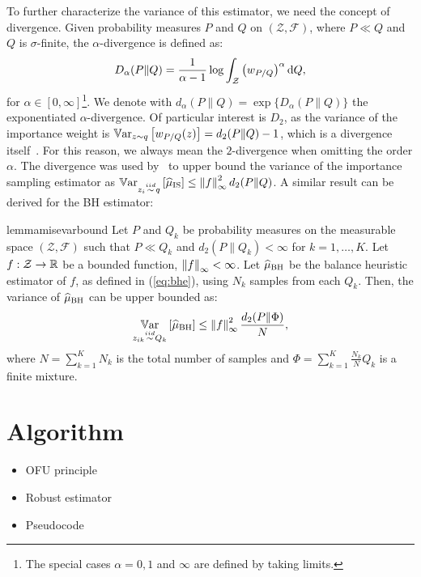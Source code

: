 \documentclass{article}
\begin{document}
To further characterize the variance of this estimator, we need the concept of \Renyi divergence. Given probability measures $P$ and $Q$ on $(\mathcal{Z},\mathcal{F})$, where $P\ll Q$ and $Q$ is $\sigma$-finite, the $\alpha$-\Renyi divergence is defined as:
\begin{align}\label{eq:renyi}
	D_{\alpha}(P\|Q) = \frac{1}{\alpha-1}\log\int_{\mathcal{Z}}\left(w_{P/Q}\right)^{\alpha}\de Q,
\end{align}
for $\alpha\in[0,\infty]$\footnote{The special cases $\alpha=0,1$ and $\infty$ are defined by taking limits.}.
We denote with $d_{\alpha}(P\|Q) = \exp\{D_{\alpha}(P\|Q)\}$ the exponentiated $\alpha$-\Renyi divergence. Of particular interest is $D_2$, as the variance of the importance weight is $\Var_{z\sim q}\left[w_{P/Q}(z)\right] = d_2(P\|Q) - 1$, which is a divergence itself~\citep{cortes2010learning}. For this reason, we always mean the $2$-\Renyi divergence when omitting the order $\alpha$. The \Renyi divergence was used by~\citet[][Lemma 4.1]{metelli2018policy} to upper bound the variance of the importance sampling estimator as $\Var_{z_i\simiid q}\left[\wh{\mu}_{\text{IS}}\right]\leq \norm[\infty]{f}^2d_2(P\|Q)$. A similar result can be derived for the BH estimator:
%
\begin{restatable}{lemma}{misevarbound}\label{lem:misevarbound}
	Let $P$ and $Q_k$ be probability measures on the measurable space $(\mathcal{Z},\mathcal{F})$ such that $P\ll Q_k$ and $d_2(P\|Q_k)<\infty$ for $k=1,\dots,K$. Let $f:\mathcal{Z}\to\Reals$ be a bounded function, \ie $\norm[\infty]{f}<\infty$. Let $\wh{\mu}_{\text{BH}}$ be the balance heuristic estimator of $f$, as defined in (\ref{eq:bhe}), using $N_k$ \iid samples from each $Q_k$. Then, the variance of $\wh{\mu}_{\text{BH}}$ can be upper bounded as:
	\begin{align*}
		\Var_{z_{ik}\simiid Q_k}\left[\wh{\mu}_{\text{BH}}\right] \leq \norm[\infty]{f}^2\frac{d_2(P\|\Phi)}{N},
	\end{align*}
	where ${N=\sum_{k=1}^{K}N_k}$ is the total number of samples and ${\Phi=\sum_{k=1}^K\frac{N_k}{N}Q_k}$ is a finite mixture.
\end{restatable}
%

\section{Algorithm}
\begin{itemize}
	\item OFU principle
	\item Robust estimator
	\item Pseudocode
\end{itemize}
\end{document}
